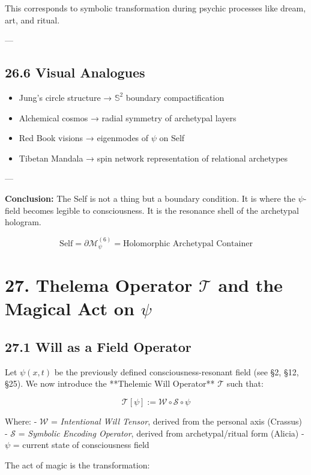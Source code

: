 \documentclass[12pt]{article}
\begin{document}
\begin{enumerate}
This corresponds to symbolic transformation during psychic processes like dream, art, and ritual.

---

\subsection*{26.6 Visual Analogues}

\begin{itemize}
  \item Jung’s circle structure → $\mathbb{S}^2$ boundary compactification
  \item Alchemical cosmos → radial symmetry of archetypal layers
  \item Red Book visions → eigenmodes of $\psi$ on Self
  \item Tibetan Mandala → spin network representation of relational archetypes
\end{itemize}

---

\textbf{Conclusion:} The Self is not a thing but a boundary condition.  
It is where the $\psi$-field becomes legible to consciousness.  
It is the resonance shell of the archetypal hologram.

\[
\boxed{
\text{Self} = \partial \mathcal{M}_\psi^{(6)} = \text{Holomorphic Archetypal Container}
}
\]

\section*{27. Thelema Operator $\mathcal{T}$ and the Magical Act on $\psi$}

\subsection*{27.1 Will as a Field Operator}

Let $\psi(x, t)$ be the previously defined consciousness-resonant field (see §2, §12, §25).  
We now introduce the **Thelemic Will Operator** $\mathcal{T}$ such that:

\[
\mathcal{T}[\psi] := \mathcal{W} \circ \mathcal{S} \circ \psi
\]

Where:
- $\mathcal{W}$ = \textit{Intentional Will Tensor}, derived from the personal axis (Crassus)
- $\mathcal{S}$ = \textit{Symbolic Encoding Operator}, derived from archetypal/ritual form (Alicia)
- $\psi$ = current state of consciousness field

The act of magic is the transformation:


\end{enumerate}
\end{document}

